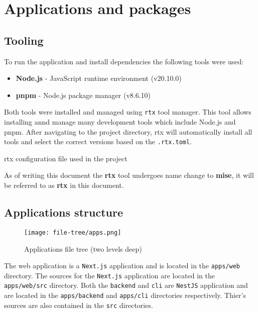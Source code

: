 \documentclass[../main.tex]{subfiles}
\begin{document}
\section{Applications and packages}

\subsection{Tooling}

To run the application and install dependencies the following tools were used:

\begin{itemize}
  \item \textbf{Node.js} \cite{nodejs} - JavaScript runtime environment (v20.10.0)
  \item \textbf{pnpm} \cite{pnpm} - Node.js package manager (v8.6.10)
\end{itemize}

Both tools were installed and managed using \texttt{rtx} \cite{rtx} tool manager.
This tool allows installing annd manage many development tools which include Node.js and pnpm.
After navigating to the project directory, rtx will automatically install all tools and select the correct versions based on the \texttt{.rtx.toml}.

\begin{listing}[H]
  \caption{rtx configuration file used in the project}
\end{listing}

As of writing this document the \textbf{rtx} tool undergoes name change to \textbf{mise}, it will be referred to as \textbf{rtx} in this document.

\subsection{Applications structure}

\begin{figure}[H]
  \centering
  \texttt{[image: file-tree/apps.png]}
  \caption{Applications file tree (two levels deep)}
  \label{fig:apps-file-tree}
\end{figure}

The web application is a \texttt{Next.js} application and is located in the \texttt{apps/web} directory.
The sources for the \texttt{Next.js} application are located in the \texttt{apps/web/src} directory.
Both the \texttt{backend} and \texttt{cli} are \texttt{NestJS} application and are located in the \texttt{apps/backend} and \texttt{apps/cli} directories respectively.
Thier's sources are also contained in the \texttt{src} directories.
\end{document}
